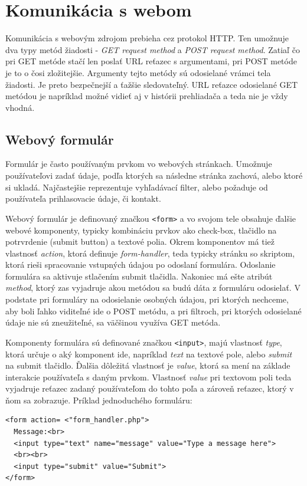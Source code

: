\documentclass[12pt,twoside,slovak,a4paper]{article}
\begin{document}
		 
\section{Komunikácia s webom}
Komunikácia s webovým zdrojom prebieha cez protokol HTTP. Ten umožnuje dva typy metód žiadosti - \emph{GET request method} a \emph{POST request method}.  Zatiaľ čo pri GET metóde stačí len poslať URL reťazec s argumentami, pri POST metóde je to o čosi zložitejšie. Argumenty tejto metódy sú odosielané vrámci tela žiadosti. Je preto bezpečnejší a ťažšie sledovateľný. URL reťazce odosielané GET metódou je napríklad možné vidieť aj v histórii prehliadača a teda nie je vždy vhodná.

	\subsection{Webový formulár}
	Formulár je často používaným prvkom vo webových stránkach. Umožnuje používateľovi zadať údaje, podľa ktorých sa následne stránka zachová, alebo ktoré si ukladá. Najčastejšie reprezentuje vyhľadávací filter, alebo požaduje od používateľa prihlasovacie údaje, či kontakt.
	
	Webový formulár je definovaný značkou \texttt{<form>} a vo svojom tele obsahuje ďalšie webové komponenty, typicky kombináciu prvkov ako check-box, tlačidlo na potrvrdenie (submit button) a textové polia. Okrem komponentov má tiež vlastnosť \emph{action}, ktorá definuje \emph{form-handler}, teda typicky stránku so skriptom, ktorá rieši spracovanie vstupných údajou po odoslaní formulára. Odoslanie formulára sa aktivuje stlačením submit tlačidla. Nakoniec má ešte atribút \emph{method}, ktorý zas vyjadruje akou metódou sa budú dáta z formuláru odosielať. V podstate pri formuláry na odosielanie osobných údajou, pri ktorých nechceme, aby boli ľahko viditeľné ide o POST metódu, a pri filtroch, pri ktorých odosielané údaje nie sú zneužiteľné, sa väčšinou využíva GET metóda.
	
	Komponenty formulára sú definované značkou \texttt{<input>}, majú vlastnosť \emph{type}, ktorá určuje o aký komponent ide, napríklad \emph{text} na textové pole, alebo \emph{submit} na submit tlačidlo. Ďalšia dôležitá vlastnosť je \emph{value}, ktorá sa mení na základe interakcie používateľa s daným prvkom. Vlastnosť \emph{value} pri textovom poli teda vyjadruje reťazec zadaný používateľom do tohto poľa a zároveň reťazec, ktorý v ňom sa zobrazuje.
\newline \newline	
Príklad jednoduchého formuláru: 
\small
\begin{verbatim}
<form action= <"form_handler.php">   
  Message:<br> 
  <input type="text" name="message" value="Type a message here"> 
  <br><br> 
  <input type="submit" value="Submit">
</form> 
\end{verbatim}
\normalsize	
\end{document}
